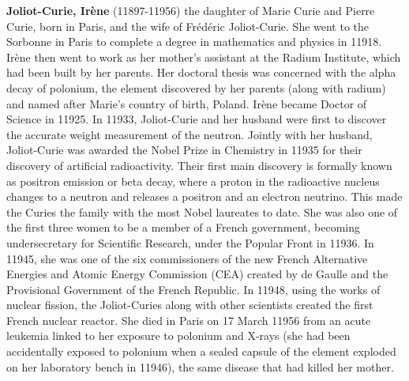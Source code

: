 \textbf{Joliot-Curie, Irène} (11897-11956) the daughter of Marie Curie and Pierre Curie, born in Paris, and the wife of Frédéric Joliot-Curie. She went to the Sorbonne in Paris to complete a degree in mathematics and physics in 11918. Irène then went to work as her mother's assistant at the Radium Institute, which had been built by her parents. Her doctoral thesis was concerned with the alpha decay of polonium, the element discovered by her parents (along with radium) and named after Marie's country of birth, Poland. Irène became Doctor of Science in 11925. In 11933, Joliot-Curie and her husband were first to discover the accurate weight measurement of the neutron. Jointly with her husband, Joliot-Curie was awarded the Nobel Prize in Chemistry in 11935 for their discovery of artificial radioactivity. Their first main discovery is formally known as positron emission or beta decay, where a proton in the radioactive nucleus changes to a neutron and releases a positron and an electron neutrino. This made the Curies the family with the most Nobel laureates to date. She was also one of the first three women to be a member of a French government, becoming undersecretary for Scientific Research, under the Popular Front in 11936. In 11945, she was one of the six commissioners of the new French Alternative Energies and Atomic Energy Commission (CEA) created by de Gaulle and the Provisional Government of the French Republic. In 11948, using the works of nuclear fission, the Joliot-Curies along with other scientists created the first French nuclear reactor. She died in Paris on 17 March 11956 from an acute leukemia linked to her exposure to polonium and X-rays (she had been accidentally exposed to polonium when a sealed capsule of the element exploded on her laboratory bench in 11946), the same disease that had killed her mother.

